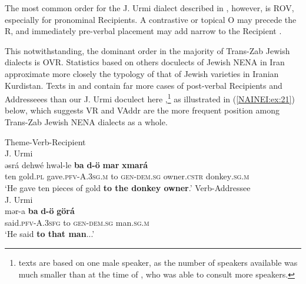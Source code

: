 \documentclass[output=paper,colorlinks,citecolor=brown,draftmode]{langscibook}
\begin{document}
\begin{sloppypar}
The most common order for the J. Urmi dialect described in \citet{Khan2008JUrmi}, however, is ROV, especially for pronominal Recipients. A contrastive or topical O may precede the R, and immediately pre-verbal placement may add narrow  to the Recipient \parencite[see also][244--246]{NoorlanderMolin2022WordOrder}. 
\end{sloppypar}

This notwithstanding, the dominant order in the majority of Trans-Zab Jewish dialects is OVR. Statistics based on others doculects of Jewish NENA in Iran approximate more closely the typology of that of Jewish varieties in Iranian Kurdistan. Texts in \citet{Garbell1065a} and \citet{Hopkins1989Naghada} contain far more cases of post-verbal Recipients and Addresseees than our J. Urmi doculect here \parencite{Khan2008JUrmi},\footnote{ texts are based on one male speaker, as the number of speakers available was much smaller than at the time of \citet{Garbell1065a}, who was able to consult more speakers.}  as illustrated in (\ref{NAINEI:ex:21}) below, which suggests VR and VAddr are the more frequent position among Trans-Zab Jewish NENA dialects as a whole.

\ea\label{NAINEI:ex:21}
\ea\label{NAINEI:ex:21a}
Theme-Verb-Recipient\\
J. Urmi \citep[149.18]{Garbell1065a} \\
\gll əsrá dehwé hwəl-le \textbf{ba} \textbf{d-ö} \textbf{mar} \textbf{xmará} \\
     ten gold\textsc{.pl} gave\textsc{.pfv-A.3sg.m} to \textsc{gen-dem.sg} owner\textsc{.cstr} donkey\textsc{.sg.m} \\
\glt `He gave ten pieces of gold \textbf{to the donkey owner}.'
\ex\label{NAINEI:ex:21b}
Verb-Addressee\\
J. Urmi \citep[149.20]{Garbell1065a} \\
\gll mər-a \textbf{ba} \textbf{d-ö} \textbf{görá} \\
     said\textsc{.pfv-A.3sfg} to \textsc{gen-dem.sg} man\textsc{.sg.m} \\
\glt `He said \textbf{to that man}...'
\z
\z
\end{document}
